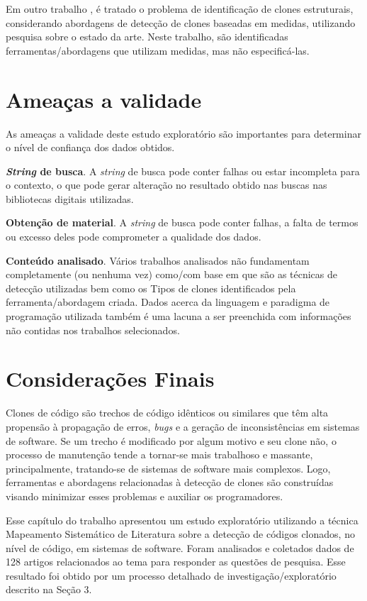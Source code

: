 Em outro trabalho \citeauthor{kapdan2014structural}, é tratado o problema de identificação de clones estruturais, considerando abordagens de detecção de clones baseadas em medidas, utilizando pesquisa sobre o estado da arte. Neste trabalho, são identificadas ferramentas/abordagens que utilizam medidas, mas não especificá-las.

\section{Ameaças a validade}
As ameaças a validade deste estudo exploratório são importantes para determinar o nível de confiança dos dados obtidos.

\textbf{\textit{String} de busca}. A \textit{string} de busca pode conter falhas ou estar incompleta para o contexto, o que pode gerar alteração no resultado obtido nas buscas nas bibliotecas digitais utilizadas.

\textbf{Obtenção de material}. A \textit{string} de busca pode conter falhas, a falta de termos ou excesso deles pode comprometer a qualidade dos dados. 

\textbf{Conteúdo analisado}. Vários trabalhos analisados não fundamentam completamente (ou nenhuma vez) como/com base em que são as técnicas de detecção utilizadas bem como os Tipos de clones identificados pela ferramenta/abordagem criada. Dados acerca da linguagem e paradigma de programação utilizada também é uma lacuna a ser preenchida com informações não contidas nos trabalhos selecionados.

\section{Considerações Finais}

Clones de código são trechos de código idênticos ou similares que têm alta propensão à propagação de erros, \textit{bugs} e a geração de inconsistências em sistemas de software. Se um trecho é modificado por algum motivo e seu clone não, o processo de manutenção tende a tornar-se mais trabalhoso e massante, principalmente, tratando-se de sistemas de software mais complexos. Logo, ferramentas e abordagens relacionadas à detecção de clones são construídas visando minimizar esses problemas e auxiliar os programadores.

Esse capítulo do trabalho apresentou um estudo exploratório utilizando a técnica Mapeamento Sistemático de Literatura sobre a detecção de códigos clonados, no nível de código, em sistemas de software. Foram analisados e coletados dados de 128 artigos relacionados ao tema para responder as questões de pesquisa. Esse resultado foi obtido por um processo detalhado de investigação/exploratório descrito na Seção 3.

